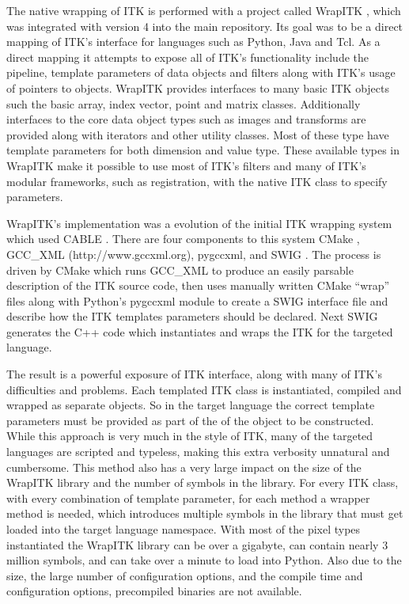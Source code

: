 \documentclass{frontiersMED} %
\begin{document}
The native wrapping of ITK is performed with a project called WrapITK
\cite{Lehmann2006}, which was integrated with version 4 into the main
repository. Its goal was to be a direct mapping of ITK's interface for
languages such as Python, Java and Tcl. As a direct mapping it
attempts to expose all of ITK's functionality include the pipeline,
template parameters of data objects and filters along with ITK's usage
of pointers to objects. WrapITK provides interfaces to many basic ITK
objects such the basic array, index vector, point and matrix
classes. Additionally interfaces to the core data object types such as
images and transforms are provided along with iterators and other
utility classes. Most of these type have template parameters for both
dimension and value type. These available types in WrapITK make it
possible to use most of ITK's filters and many of ITK's modular
frameworks, such as registration, with the native ITK class to specify
parameters.

WrapITK's implementation was a evolution of the initial ITK wrapping
system which used CABLE \cite{Lehmann2006}. There are four components to
this system CMake \cite{Martin2003}, GCC\_XML (http://www.gccxml.org), pygccxml, and SWIG
\cite{Beazley2003}. The process is driven by CMake which runs GCC\_XML to
produce an easily parsable description of the ITK source code, then
uses manually written CMake ``wrap'' files along with Python's pygccxml
module to create a SWIG interface file and describe how the ITK
templates parameters should be declared. Next SWIG generates the C++
code which instantiates and wraps the ITK for the targeted language.

The result is a powerful exposure of ITK interface, along with many of
ITK's difficulties and problems. Each templated ITK class is
instantiated, compiled and wrapped as separate objects. So in the
target language the correct template parameters must be provided as
part of the of the object to be constructed. While this approach is
very much in the style of ITK, many of the targeted languages are
scripted and typeless, making this extra verbosity unnatural and
cumbersome.  This method also has a very large impact on the size of
the WrapITK library and the number of symbols in the library. For
every ITK class, with every combination of template parameter, for
each method a wrapper method is needed, which introduces multiple
symbols in the library that must get loaded into the target language
namespace. With most of the pixel types instantiated the WrapITK
library can be over a gigabyte, can contain nearly 3 million symbols,
and can take over a minute to load into Python. Also due to the size,
the large number of configuration options, and the compile time and
configuration options, precompiled binaries are not available.
\end{document}
